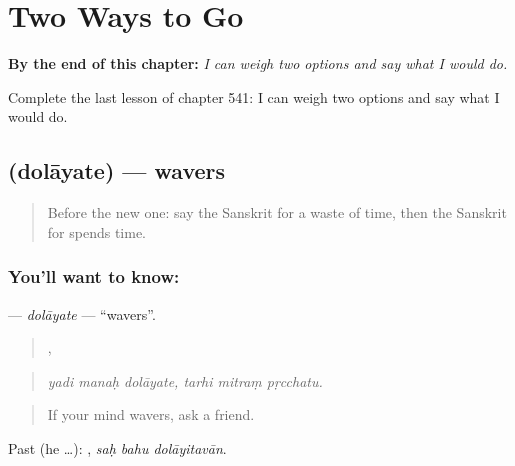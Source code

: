
\chapter{Two Ways to Go}
\label{ch:sa-two-ways-to-go}

\begin{chapteropening}
\textbf{By the end of this chapter:} \emph{I can weigh two options and say what I would do.}

Complete the last lesson of chapter 541: I can weigh two options and say what I would do.
\end{chapteropening}

\section[\texorpdfstring{\sk{दोलायते} (dolāyate)}{दोलायते (dolāyate)}]{ (dolāyate) — wavers}

\label{lesson:SA-C541-dolayate}



\begin{quote}
Before the new one: say the Sanskrit for a waste of time, then the Sanskrit for spends time.
\end{quote}

\subsection*{You'll want to know: }
\textbf{} — \emph{dolāyate} — \textquotedblleft{}wavers\textquotedblright{}.

\begin{quote}
  ,   
\end{quote}

\begin{quote}
\emph{yadi manaḥ dolāyate, tarhi mitraṃ pṛcchatu.}
\end{quote}

\begin{quote}
If your mind wavers, ask a friend.
\end{quote}

Past (he …):   , \emph{saḥ bahu dolāyitavān}.

